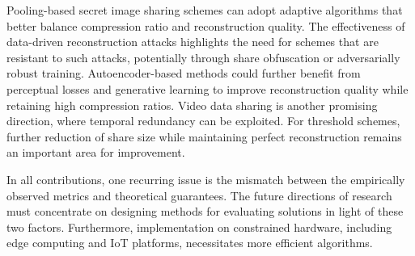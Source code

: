 Pooling-based secret image sharing schemes can adopt adaptive algorithms that better balance compression ratio and reconstruction quality. The effectiveness of data-driven reconstruction attacks highlights the need for schemes that are resistant to such attacks, potentially through share obfuscation or adversarially robust training. Autoencoder-based methods could further benefit from perceptual losses and generative learning to improve reconstruction quality while retaining high compression ratios. Video data sharing is another promising direction, where temporal redundancy can be exploited. For threshold schemes, further reduction of share size while maintaining perfect reconstruction remains an important area for improvement.

In all contributions, one recurring issue is the mismatch between the empirically observed metrics and theoretical guarantees. The future directions of research must concentrate on designing methods for evaluating solutions in light of these two factors. Furthermore, implementation on constrained hardware, including edge computing and IoT platforms, necessitates more efficient algorithms.
